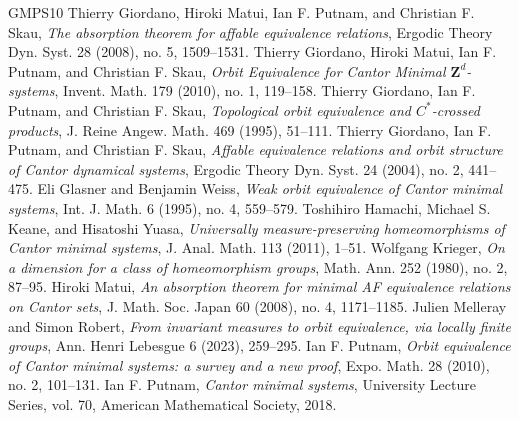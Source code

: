\documentclass[10pt,a4paper]{article}
\theoremstyle{definition}
\newcommand{\Z}{\mathbf{Z}}
\begin{document}
\begin{thebibliography}{GMPS10}
 Thierry Giordano, Hiroki Matui, Ian F. Putnam, and Christian F. Skau, \emph{The absorption theorem for affable equivalence relations}, Ergodic Theory Dyn. Syst. 28 (2008), no. 5, 1509--1531.
 Thierry Giordano, Hiroki Matui, Ian F. Putnam, and Christian F. Skau, \emph{Orbit Equivalence for Cantor Minimal $\Z^d$-systems}, Invent. Math. 179 (2010), no. 1, 119--158.
 Thierry Giordano, Ian F. Putnam, and Christian F. Skau, \emph{Topological orbit equivalence and $C^*$-crossed products}, J. Reine Angew. Math. 469 (1995), 51--111.
 Thierry Giordano, Ian F. Putnam, and Christian F. Skau, \emph{Affable equivalence relations and orbit structure of Cantor dynamical systems}, Ergodic Theory Dyn. Syst. 24 (2004), no. 2, 441--475.
 Eli Glasner and Benjamin Weiss, \emph{Weak orbit equivalence of Cantor minimal systems}, Int. J. Math. 6 (1995), no. 4, 559--579.
 Toshihiro Hamachi, Michael S. Keane, and Hisatoshi Yuasa, \emph{Universally measure-preserving homeomorphisms of Cantor minimal systems}, J. Anal. Math. 113 (2011), 1--51.
 Wolfgang Krieger, \emph{On a dimension for a class of homeomorphism groups}, Math. Ann. 252 (1980), no. 2, 87--95.
 Hiroki Matui, \emph{An absorption theorem for minimal AF equivalence relations on Cantor sets}, J. Math. Soc. Japan 60 (2008), no. 4, 1171--1185.
 Julien Melleray and Simon Robert, \emph{From invariant measures to orbit equivalence, via locally finite groups}, Ann. Henri Lebesgue 6 (2023), 259--295.
 Ian F. Putnam, \emph{Orbit equivalence of Cantor minimal systems: a survey and a new proof}, Expo. Math. 28 (2010), no. 2, 101--131.
 Ian F. Putnam, \emph{Cantor minimal systems}, University Lecture Series, vol. 70, American Mathematical Society, 2018.
\end{thebibliography}
\end{document}
